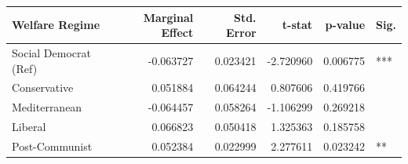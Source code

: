 \begin{tabular}{lrrrrl}
\toprule
Welfare Regime & Marginal Effect & Std. Error & t-stat & p-value & Sig. \\
\midrule
Social Democrat (Ref) & -0.063727 & 0.023421 & -2.720960 & 0.006775 & *** \\
Conservative & 0.051884 & 0.064244 & 0.807606 & 0.419766 &  \\
Mediterranean & -0.064457 & 0.058264 & -1.106299 & 0.269218 &  \\
Liberal & 0.066823 & 0.050418 & 1.325363 & 0.185758 &  \\
Post-Communist & 0.052384 & 0.022999 & 2.277611 & 0.023242 & ** \\
\bottomrule
\end{tabular}
